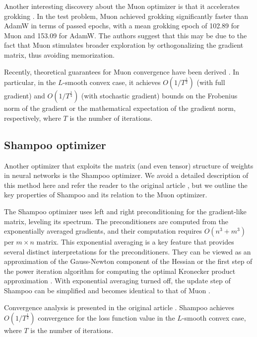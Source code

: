 \documentclass{article} %
\begin{document}
Another interesting discovery about the Muon optimizer is that it accelerates grokking \cite{tveit2025muonoptimizeracceleratesgrokking}. In the test problem, Muon achieved grokking significantly faster than AdamW in terms of passed epochs, with a mean grokking epoch of 102.89 for Muon and 153.09 for AdamW. The authors suggest that this may be due to the fact that Muon stimulates broader exploration by orthogonalizing the gradient matrix, thus avoiding memorization.

Recently, theoretical guarantees for Muon convergence have been derived \cite{li2025noteconvergencemuon}. In particular, in the $L$-smooth convex case, it achieves $O(1/T^{\frac{1}{2}})$ (with full gradient) and $O(1/T^{\frac{1}{4}})$ (with stochastic gradient) bounds on the Frobenius norm of the gradient or the mathematical expectation of the gradient norm, respectively, where $T$ is the number of iterations.

\subsection{Shampoo optimizer}

Another optimizer that exploits the matrix (and even tensor) structure of weights in neural networks is the Shampoo optimizer. We avoid a detailed description of this method here and refer the reader to the original article \cite{gupta2018shampoopreconditionedstochastictensor}, but we outline the key properties of Shampoo and its relation to the Muon optimizer.

The Shampoo optimizer uses left and right preconditioning for the gradient-like matrix, leveling its spectrum. The preconditioners are computed from the exponentially averaged gradients, and their computation requires $O(n^3 + m^3)$ per $m \times n$ matrix. This exponential averaging is a key feature that provides several distinct interpretations for the preconditioners. They can be viewed as an approximation of the Gauss-Newton component of the Hessian or the first step of the power iteration algorithm for computing the optimal Kronecker product approximation \cite{morwani2025a}. With exponential averaging turned off, the update step of Shampoo can be simplified and becomes identical to that of Muon \cite{jordan2024muon}.

Convergence analysis is presented in the original article \cite{gupta2018shampoopreconditionedstochastictensor}. Shampoo achieves $O(1/T^{\frac{1}{2}})$ convergence for the loss function value in the $L$-smooth convex case, where $T$ is the number of iterations.
\end{document}
